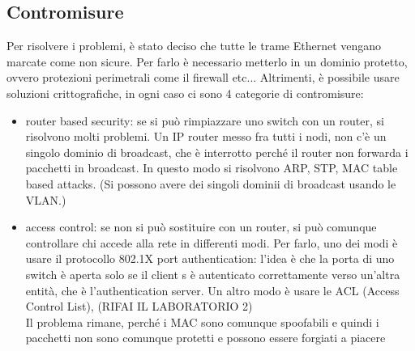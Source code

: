 \documentclass[12pt, oneside]{extbook} %
\begin{document}
\subsection{Contromisure}
Per risolvere i problemi, è stato deciso che tutte le trame Ethernet vengano marcate come non sicure. Per farlo è necessario metterlo in un dominio protetto, ovvero protezioni perimetrali come il firewall etc... Altrimenti, è possibile usare soluzioni crittografiche, in ogni caso ci sono 4 categorie di contromisure:
\begin{itemize}
\item router based security: se si può rimpiazzare uno switch con un router, si risolvono molti problemi. Un IP router messo fra tutti i nodi, non c'è un singolo dominio di broadcast, che è interrotto perché il router non forwarda i pacchetti in broadcast. In questo modo si risolvono ARP, STP, MAC table based attacks. (Si possono avere dei singoli dominii di broadcast usando le VLAN.)
\item access control: se non si può sostituire con un router, si può comunque controllare chi accede alla rete in differenti modi. Per farlo, uno dei modi è usare il protocollo 802.1X port authentication: l'idea è che la porta di uno switch è aperta solo se il client s è autenticato correttamente verso un'altra entità, che è l'authentication server. Un altro modo è usare le ACL (Access Control List), (RIFAI IL LABORATORIO 2)\\ Il problema rimane, perché i MAC sono comunque spoofabili e quindi i pacchetti non sono comunque protetti e possono essere forgiati a piacere
\end{itemize}
\end{document}

